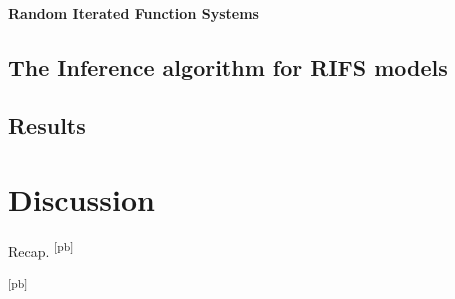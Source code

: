 \documentclass[10pt,a4paper,oneside]{article}
\theoremstyle{definition}
\newcommand{\pb}[1]{\textcolor{OliveGreen}{\small #1 \textsuperscript{[pb]} }}
\begin{document}
\paragraph{Random Iterated Function Systems}

\subsection{The Inference algorithm for RIFS models}
\subsection{Results}

\section{Discussion}

\pb{Recap.}

\pb{}



\end{document}
